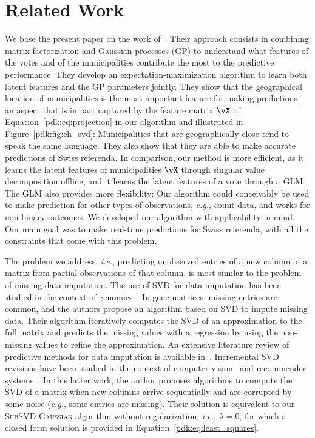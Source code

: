 \section{Related Work}%
\label{pdk:sec:relwork}

We base the present paper on the work of~\citet{etter2014mining,etter2016online}.
Their approach consists in combining matrix factorization and Gaussian processes (GP) to understand what features of the votes and of the municipalities contribute the most to the predictive performance.
They develop an expectation-maximization algorithm to learn both latent features and the GP parameters jointly.
They show that the geographical location of municipalities is the most important feature for making predictions, an aspect that is in part captured by the feature matrix $\vX$ of Equation~\eqref{pdk:eq:projection} in our algorithm and illustrated in Figure~\ref{pdk:fig:ch_svd}:
Municipalities that are geographically close tend to speak the same language.
They also show that they are able to make accurate predictions of Swiss referenda.
In comparison, our method is more efficient, as it learns the latent features of municipalities $\vX$ through singular value decomposition offline, and it learns the latent features of a vote through a GLM.
The GLM also provides more flexibility:
Our algorithm could conceivably be used to make prediction for other types of observations, \textit{e.g.}, count data, and works for non-binary outcomes.
We developed our algorithm with applicability in mind.
Our main goal was to make real-time predictions for Swiss referenda, with all the constraints that come with this problem.

The problem we address, \textit{i.e.}, predicting unobserved entries of a new column of a matrix from partial observations of that column, is most similar to the problem of missing-data imputation.
The use of SVD for data imputation has been studied in the context of genomics~\citep{troyanskaya2001missing,hastie1999imputing}.
In gene matrices, missing entries are common, and the authors propose an algorithm based on SVD to impute missing data.
Their algorithm iteratively computes the SVD of an approximation to the full matrix and predicts the missing values with a regression by using the non-missing values to refine the approximation.
An extensive literature review of predictive methods for data imputation is available in~\citet{bertsimas2017predictive}.
Incremental SVD revisions have been studied in the context of computer vision~\citep{brand2002incremental} and recommender systems~\citep{brand2003fast}.
In this latter work, the author proposes algorithms to compute the SVD of a matrix when new columns arrive sequentially and are corrupted by some noise (\textit{e.g.}, some entries are missing).
Their solution is equivalent to our \textsc{SubSVD-Gaussian} algorithm without regularization, \textit{i.e.}, $\lambda=0$, for which a closed form solution is provided in Equation~\eqref{pdk:eq:least_squares}.

